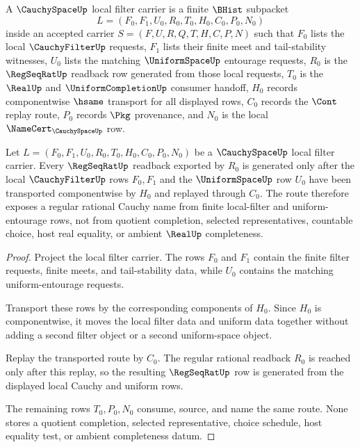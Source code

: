 \begin{definition}
\label{def:cauchyspace-local-filter-carrier}
A $\CauchySpaceUp$ local filter carrier is a finite $\BHist$ subpacket
$$
L=(F_0,F_1,U_0,R_0,T_0,H_0,C_0,P_0,N_0)
$$
inside an accepted carrier $S=(F,U,R,Q,T,H,C,P,N)$ such that $F_0$ lists the local $\CauchyFilterUp$ requests, $F_1$ lists their finite meet and tail-stability witnesses, $U_0$ lists the matching $\UniformSpaceUp$ entourage requests, $R_0$ is the $\RegSeqRatUp$ readback row generated from those local requests, $T_0$ is the $\RealUp$ and $\UniformCompletionUp$ consumer handoff, $H_0$ records componentwise $\hsame$ transport for all displayed rows, $C_0$ records the $\Cont$ replay route, $P_0$ records $\Pkg$ provenance, and $N_0$ is the local $\NameCert_{\CauchySpaceUp}$ row.
\end{definition}

\begin{theorem}
\label{thm:cauchyspace-regseqrat-uniform-obligation}
Let $L=(F_0,F_1,U_0,R_0,T_0,H_0,C_0,P_0,N_0)$ be a $\CauchySpaceUp$ local filter carrier. Every $\RegSeqRatUp$ readback exported by $R_0$ is generated only after the local $\CauchyFilterUp$ rows $F_0,F_1$ and the $\UniformSpaceUp$ row $U_0$ have been transported componentwise by $H_0$ and replayed through $C_0$. The route therefore exposes a regular rational Cauchy name from finite local-filter and uniform-entourage rows, not from quotient completion, selected representatives, countable choice, host real equality, or ambient $\RealUp$ completeness.
\end{theorem}
\begin{proof}
Project the local filter carrier. The rows $F_0$ and $F_1$ contain the finite filter requests, finite meets, and tail-stability data, while $U_0$ contains the matching uniform-entourage requests.

Transport these rows by the corresponding components of $H_0$. Since $H_0$ is componentwise, it moves the local filter data and uniform data together without adding a second filter object or a second uniform-space object.

Replay the transported route by $C_0$. The regular rational readback $R_0$ is reached only after this replay, so the resulting $\RegSeqRatUp$ row is generated from the displayed local Cauchy and uniform rows.

The remaining rows $T_0,P_0,N_0$ consume, source, and name the same route. None stores a quotient completion, selected representative, choice schedule, host equality test, or ambient completeness datum.
\end{proof}

